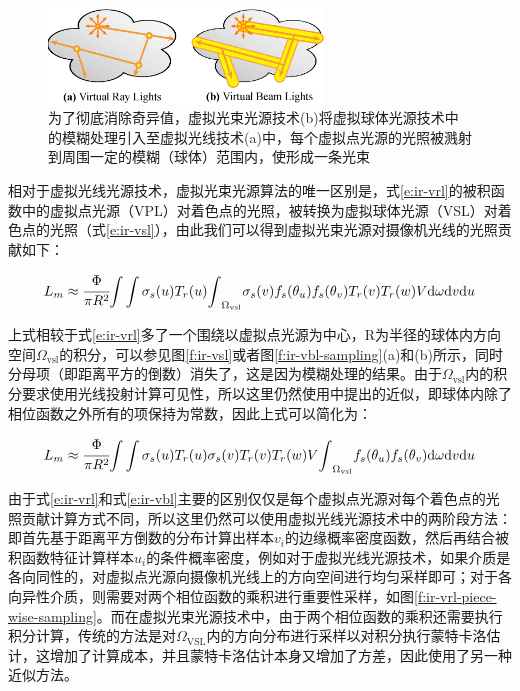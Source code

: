 \begin{figure}
	\sidecaption
	\includegraphics[width=0.65\textwidth]{figures/ir/vrl-vs-vbl}
	\caption{为了彻底消除奇异值，虚拟光束光源技术(b)将虚拟球体光源技术中的模糊处理引入至虚拟光线技术(a)中，每个虚拟点光源的光照被溅射到周围一定的模糊（球体）范围内，使形成一条光束}
	\label{f:ir-vrl-vs-vbl}
\end{figure}

相对于虚拟光线光源技术，虚拟光束光源算法的唯一区别是，式\ref{e:ir-vrl}的被积函数中的虚拟点光源（VPL）对着色点的光照，被转换为虚拟球体光源（VSL）对着色点的光照（式\ref{e:ir-vsl}），由此我们可以得到虚拟光束光源对摄像机光线的光照贡献如下：

\begin{equation}
	L_m\approx \cfrac{\Phi}{\pi R^{2}}{\rm \int}\int \sigma_s(u)T_r(u){\rm \int}_{\Omega_{\text{vsl}}}\sigma_s(v)f_s(\theta_u)f_s(\theta_v)T_r(v)T_r(w)V {\rm d}\omega {\rm d}v{\rm d}u
\end{equation}

\noindent 上式相较于式\ref{e:ir-vrl}多了一个围绕以虚拟点光源为中心，R为半径的球体内方向空间$\Omega_{\text{vsl}}$的积分，可以参见图\ref{f:ir-vsl}或者图\ref{f:ir-vbl-sampling}(a)和(b)所示，同时分母项（即距离平方的倒数）消失了，这是因为模糊处理的结果。由于$\Omega_{\text{vsl}}$内的积分要求使用光线投射计算可见性，所以这里仍然使用\cite{a:VirtualSphericalLightsforMany-LightRenderingofGlossyScenes}中提出的近似，即球体内除了相位函数之外所有的项保持为常数，因此上式可以简化为：

\begin{equation}\label{e:ir-vbl}
	L_m\approx \cfrac{\Phi}{\pi R^{2}}{\rm \int}\int \sigma_s(u)T_r(u)\sigma_s(v)T_r(v)T_r(w)V{\rm \int}_{\Omega_{\text{vsl}}}f_s(\theta_u)f_s(\theta_v) {\rm d}\omega {\rm d}v{\rm d}u
\end{equation}

\noindent 由于式\ref{e:ir-vrl}和式\ref{e:ir-vbl}主要的区别仅仅是每个虚拟点光源对每个着色点的光照贡献计算方式不同，所以这里仍然可以使用虚拟光线光源技术中的两阶段方法：即首先基于距离平方倒数的分布计算出样本$v_i$的边缘概率密度函数，然后再结合被积函数特征计算样本$u_i$的条件概率密度，例如对于虚拟光线光源技术，如果介质是各向同性的，对虚拟点光源向摄像机光线上的方向空间进行均匀采样即可；对于各向异性介质，则需要对两个相位函数的乘积进行重要性采样，如图\ref{f:ir-vrl-piece-wise-sampling}。而在虚拟光束光源技术中，由于两个相位函数的乘积还需要执行积分计算，传统的方法是对$\Omega_{\text{VSL}}$内的方向分布进行采样以对积分执行蒙特卡洛估计，这增加了计算成本，并且蒙特卡洛估计本身又增加了方差，因此\cite{a:ProgressiveVirtualBeamLights}使用了另一种近似方法。

